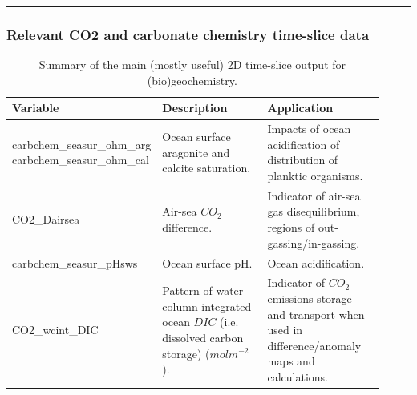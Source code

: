 \vspace{1mm} \noindent\rule{4cm}{0.1mm} \vspace{2mm}

\newpage

\subsubsection{Relevant CO2 and carbonate chemistry time-slice data}

\begin{table}[ht!]
\begin{tabular}{p{0.30\linewidth} p{0.30\linewidth} p{0.325\linewidth}}
\toprule
\textbf{Variable} & \textbf{Description} & \textbf{Application}\\
\midrule

\textsf{\footnotesize carbchem\_seasur\_ohm\_arg} \textsf{\footnotesize carbchem\_seasur\_ohm\_cal} & \small{Ocean surface aragonite and calcite saturation.} & \small{Impacts of ocean acidification of distribution of planktic organisms.}\\

\midrule

\textsf{\footnotesize CO2\_Dairsea} & \small{Air-sea \(CO_{2}\) difference.} & \small{Indicator of air-sea gas disequilibrium, regions of out-gassing/in-gassing.}\\

\midrule

\textsf{\footnotesize carbchem\_seasur\_pHsws} & \small{Ocean surface pH.} & \small{Ocean acidification.}\\

\midrule

\textsf{\footnotesize CO2\_wcint\_DIC} & \small{Pattern of water column integrated ocean \(DIC\) (i.e. dissolved carbon storage) (\(molm^{-2}\)).} & \small{Indicator of \(CO_{2}\) emissions storage and transport when used in difference/anomaly maps and calculations.}\\

\bottomrule
\end{tabular}
\caption{Summary of the main (mostly useful) 2D time-slice output for (bio)geochemistry.}
\end{table}

